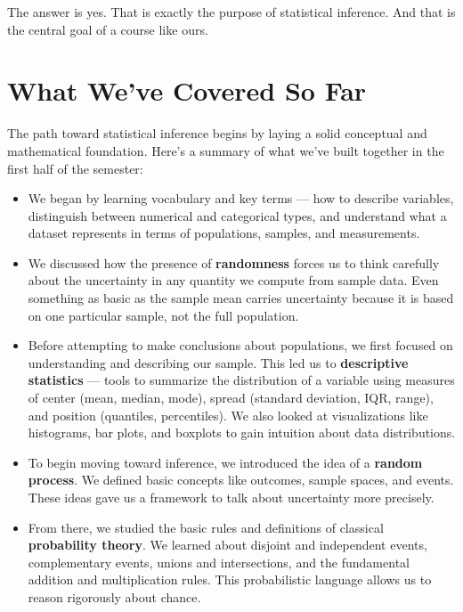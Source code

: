 \documentclass[12pt]{article}
\begin{document}
The answer is yes. That is exactly the purpose of statistical inference. And that is the central goal of a course like ours.

\section*{What We've Covered So Far}

The path toward statistical inference begins by laying a solid conceptual and mathematical foundation. Here’s a summary of what we've built together in the first half of the semester:

\begin{itemize}[leftmargin=1.5em]
    \item We began by learning vocabulary and key terms — how to describe variables, distinguish between numerical and categorical types, and understand what a dataset represents in terms of populations, samples, and measurements.

    \item We discussed how the presence of \textbf{randomness} forces us to think carefully about the uncertainty in any quantity we compute from sample data. Even something as basic as the sample mean carries uncertainty because it is based on one particular sample, not the full population.

    \item Before attempting to make conclusions about populations, we first focused on understanding and describing our sample. This led us to \textbf{descriptive statistics} — tools to summarize the distribution of a variable using measures of center (mean, median, mode), spread (standard deviation, IQR, range), and position (quantiles, percentiles). We also looked at visualizations like histograms, bar plots, and boxplots to gain intuition about data distributions.

    \item To begin moving toward inference, we introduced the idea of a \textbf{random process}. We defined basic concepts like outcomes, sample spaces, and events. These ideas gave us a framework to talk about uncertainty more precisely.

    \item From there, we studied the basic rules and definitions of classical \textbf{probability theory}. We learned about disjoint and independent events, complementary events, unions and intersections, and the fundamental addition and multiplication rules. This probabilistic language allows us to reason rigorously about chance.


\end{itemize}
\end{document}
